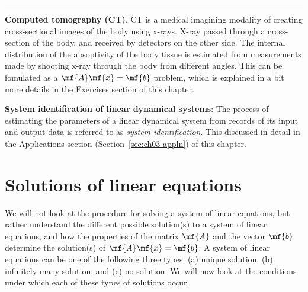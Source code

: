 \begin{boxedstuff}
    \vspace{4mm}
    \hrule
    \begin{example}
        \textbf{Computed tomography (CT)}.  CT is a medical imagining modality of creating cross-sectional images of the body using x-rays. X-ray passed through a cross-section of the body, and received by detectors on the other side. The internal distribution of the absoptivity of the body tissue is estimated from measurements made by shooting x-ray through the body from different angles. This can be fomulated as a $\mf{A}\mf{x} = \mf{b}$ problem, which is explained in a bit more details in the Exercises section of this chapter.
    \end{example}
    \begin{example}
        \textbf{System identification of linear dynamical systems}: The process of estimating the parameters of a linear dynamical system from records of its input and output data is referred to as \textit{system identification}. This discussed in detail in the Applications section (Section~\ref{sec:ch03-appln}) of this chapter.
    \end{example}
\end{boxedstuff}

\section{Solutions of linear equations}\label{sec:ch03-soln-lineq}
We will not look at the procedure for solving a system of linear equations, but rather understand the different possible solution(s) to a system of linear equations, and how the properties of the matrix $\mf{A}$ and the vector $\mf{b}$ determine the solution(s) of $\mf{A}\mf{x} = \mf{b}$. A system of linear equations can be one of the following three types: (a) unique solution, (b) infinitely many solution, and (c) no solution. We will now look at the conditions under which each of these types of solutions occur.

